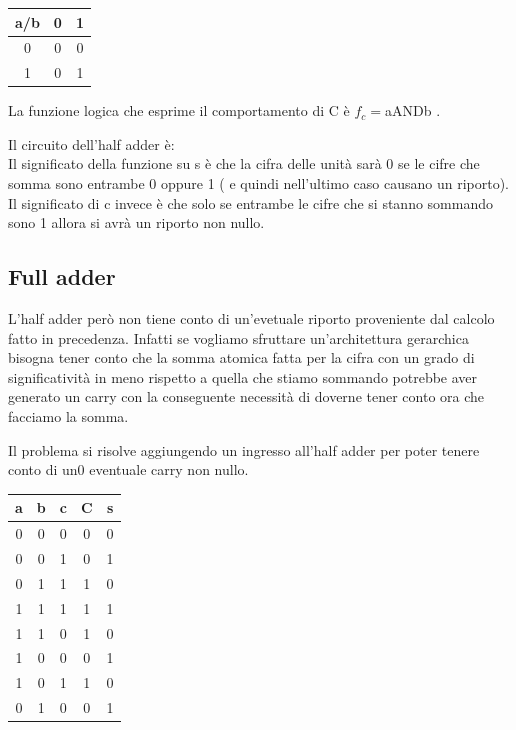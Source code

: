 \documentclass[a4paper]{book}
\begin{document}
\begin{tabular}{|c|c|c|}
\hline
a/b & 0 & 1 \\ \hline
0   & 0 & 0 \\ \hline
1   & 0 & \cellcolor{yellow}1 \\ \hline
\end{tabular}

La funzione logica che esprime il comportamento di C è \(f_c=\)aANDb .

Il circuito dell'half adder è:
\\
Il significato della funzione su s è che la cifra delle unità sarà 0 se le cifre che somma sono entrambe 0 oppure 1  ( e quindi nell'ultimo caso causano un riporto).\\
Il significato di c invece è che solo se entrambe le cifre che si stanno sommando sono 1 allora si avrà un riporto non nullo.

\subsection{Full adder}

L'half adder però non tiene conto di un'evetuale riporto proveniente dal calcolo fatto in precedenza.
Infatti se vogliamo sfruttare un'architettura gerarchica bisogna tener conto che la somma atomica fatta per la cifra con un grado di significatività in meno rispetto a quella che stiamo sommando potrebbe aver generato un carry con la conseguente necessità di doverne tener conto ora che facciamo la somma.

Il problema si risolve aggiungendo un ingresso all'half adder per poter tenere conto di un0 eventuale carry non nullo.

\begin{tabular}{|c|c|c|c|c|}
\hline
a & b & c & C & s \\
\hline
0 & 0 & 0 & 0 & 0 \\
\hline
0 & 0 & 1 & 0 & 1 \\
\hline
0 & 1 & 1 & 1 & 0 \\
\hline
1 & 1 & 1 & 1 & 1 \\
\hline
1 & 1 & 0 & 1 & 0 \\
\hline
1 & 0 & 0 & 0 & 1 \\
\hline
1 & 0 & 1 & 1 & 0 \\
\hline
0 & 1 & 0 & 0 & 1 \\
\hline 

\end{tabular}
\end{document}
